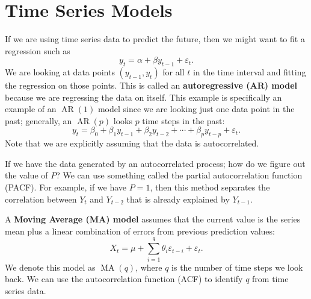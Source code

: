 \section{Time Series Models}
If we are using time series data to predict the future, then we might want to fit a regression such as $$ y_t = \alpha + \beta y_{t-1} + \varepsilon_t. $$ We are looking at data points $(y_{t-1},y_t)$ for all $t$ in the time interval and fitting the regression on those points. This is called an \textbf{autoregressive (AR) model} because we are regressing the data on itself. This example is specifically an example of an $\operatorname{AR}(1)$ model since we are looking just one data point in the past; generally, an $\operatorname{AR}(p)$ looks $p$ time steps in the past: $$ y_t = \beta_0 + \beta_1 y_{t-1} + \beta_2 y_{t-2} + \cdots + \beta_p y_{t-p} + \varepsilon_t. $$ Note that we are explicitly assuming that the data is autocorrelated.

If we have the data generated by an autocorrelated process; how do we figure out the value of $P$? We can use something called the partial autocorrelation function (PACF). For example, if we have $P=1$, then this method separates the correlation between $Y_t$ and $Y_{t-2}$ that is already explained by $Y_{t-1}$.

A \textbf{Moving Average (MA) model} assumes that the current value is the series mean plus a linear combination of errors from previous prediction values: $$ X_t = \mu + \sum_{i=1}^q \theta_i\varepsilon_{t-i} + \varepsilon_t. $$ We denote this model as $\operatorname{MA}(q)$, where $q$ is the number of time steps we look back. We can use the autocorrelation function (ACF) to identify $q$ from time series data.

